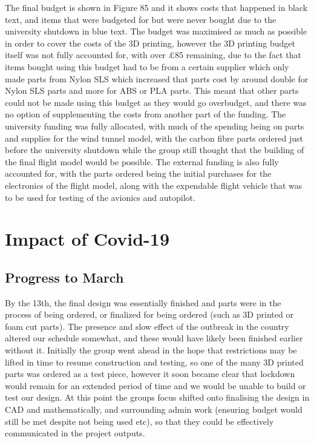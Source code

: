 \documentclass[../../main.tex]{subfiles}
\begin{document}

The final budget is shown in Figure 85 and it shows costs that happened in black text, and items that were budgeted for but were never bought due to the university shutdown in blue text.
The budget was maximised as much as possible in order to cover the costs of the 3D printing, however the 3D printing budget itself was not fully accounted for, with over £85 remaining, due to the fact that items bought using this budget had to be from a certain supplier which only made parts from Nylon SLS which increased that parts cost by around double for Nylon SLS parts and more for ABS or PLA parts.
This meant that other parts could not be made using this budget as they would go overbudget, and there was no option of supplementing the costs from another part of the funding.
The university funding was fully allocated, with much of the spending being on parts and supplies for the wind tunnel model, with the carbon fibre parts ordered just before the university shutdown while the group still thought that the building of the final flight model would be possible.
The external funding is also fully accounted for, with the parts ordered being the initial purchases for the electronics of the flight model, along with the expendable flight vehicle that was to be used for testing of the avionics and autopilot. 

\section{Impact of Covid-19} \label{sec:project-review:impact-of-covid-19}

\subsection{Progress to March} \label{sec:project-review:impact-of-covid-19:progress-to-march}

By the 13th, the final design was essentially finished and parts were in the process of being ordered, or finalized for being ordered (such as 3D printed or foam cut parts).
The presence and slow effect of the outbreak in the country altered our schedule somewhat, and these would have likely been finished earlier without it.
Initially the group went ahead in the hope that restrictions may be lifted in time to resume construction and testing, so one of the many 3D printed parts was ordered as a test piece, however it soon became clear that lockdown would remain for an extended period of time and we would be unable to build or test our design.
At this point the groups focus shifted onto finalising the design in CAD and mathematically, and surrounding admin work (ensuring budget would still be met despite not being used etc), so that they could be effectively communicated in the project outputs. 
\end{document}
